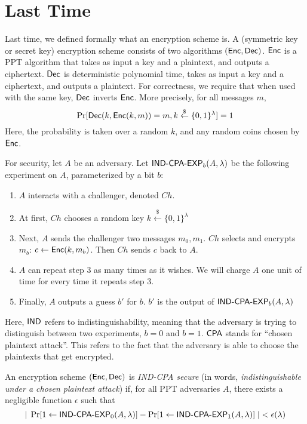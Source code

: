 




\section{Last Time}

Last time, we defined formally what an encryption scheme is.  A (symmetric key or secret key) encryption scheme consists of two algorithms $({\sf Enc},{\sf Dec})$.  ${\sf Enc}$ is a PPT algorithm that takes as input a key and a plaintext, and outputs a ciphertext.  ${\sf Dec}$ is deterministic polynomial time, takes as input a key and a ciphertext, and outputs a plaintext.  For correctness, we require that when used with the same key, ${\sf Dec}$ inverts ${\sf Enc}$.  More precisely, for all messages $m$,
\[\Pr[{\sf Dec}(k,{\sf Enc}(k,m))=m,k\stackrel{\$}{\gets}\{0,1\}^\lambda]=1\]
Here, the probability is taken over a random $k$, and any random coins chosen by ${\sf Enc}$.  

For security, let $A$ be an adversary.  Let $\text{\sf IND-CPA-EXP}_b(A,\lambda)$ be the following experiment on $A$, parameterized by a bit $b$:
\begin{enumerate}
	\item $A$ interacts with a challenger, denoted $Ch$.
	\item At first, $Ch$ chooses a random key $k\stackrel{\$}{\gets}\{0,1\}^\lambda$
	\item Next, $A$ sends the challenger two messages $m_0,m_1$.  $Ch$ selects and encrypts $m_b$: $c\gets{\sf Enc}(k,m_b)$.  Then $Ch$ sends $c$ back to $A$.
	\item $A$ can repeat step 3 as many times as it wishes.  We will charge $A$ one unit of time for every time it repeats step 3.
	\item Finally, $A$ outputs a guess $b'$ for $b$.  $b'$ is the output of $\text{\sf IND-CPA-EXP}_b(A,\lambda)$
\end{enumerate}

Here, ${\sf IND}$ refers to indistinguishability, meaning that the adversary is trying to distinguish between two experiments, $b=0$ and $b=1$.  ${\sf CPA}$ stands for ``chosen plaintext attack''.  This refers to the fact that the adversary is able to choose the plaintexts that get encrypted.

\begin{definition} An encryption scheme $({\sf Enc},{\sf Dec})$ is \emph{{\sf IND-CPA} secure} (in words, \emph{indistinguishable under a chosen plaintext attack}) if, for all PPT adversaries $A$, there exists a negligible function $\epsilon$ such that
	\[|\;\Pr[1\gets\text{\sf IND-CPA-EXP}_0(A,\lambda)]-\Pr[1\gets\text{\sf IND-CPA-EXP}_1(A,\lambda)]\;|<\epsilon(\lambda)\]
\end{definition}

